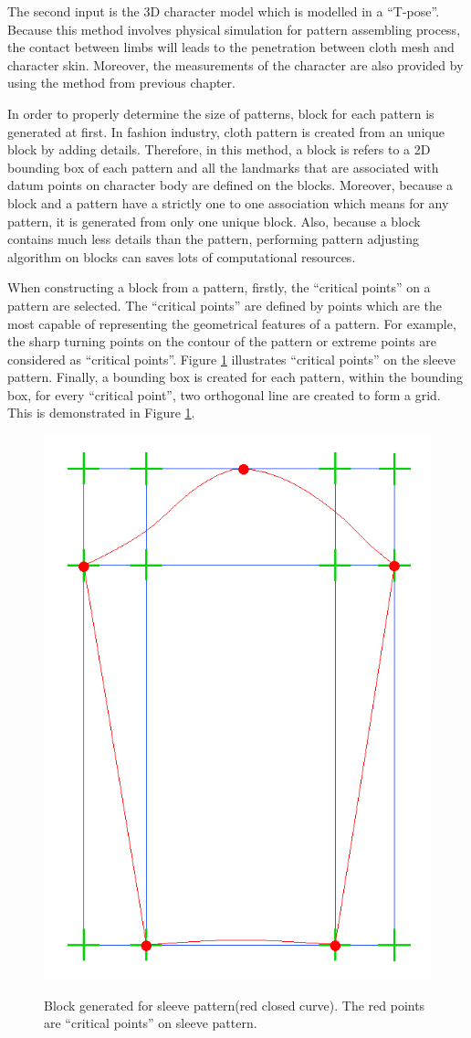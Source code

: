 The second input is the 3D character model which is modelled in a ``T-pose''. Because this method involves physical simulation for pattern assembling process, the contact between limbs will leads to the penetration between cloth mesh and character skin. Moreover, the measurements of the character are also provided by using the method from previous chapter.

In order to properly determine the size of patterns, block for each pattern is generated at first. In fashion industry, cloth pattern is created from an unique block by adding details. Therefore, in this method, a block is refers to a 2D bounding box of each pattern and all the landmarks that are associated with datum points on character body are defined on the blocks. Moreover, because a block and a pattern have a strictly one to one association which means for any pattern, it is generated from only one unique block. Also, because a block contains much less details than the pattern, performing pattern adjusting algorithm on blocks can saves lots of computational resources.

When constructing a block from a pattern, firstly, the ``critical points'' on a pattern are selected. The ``critical points'' are defined by points which are the most capable of representing the geometrical features of a pattern. For example, the sharp turning points on the contour of the pattern or extreme points are considered as ``critical points''. Figure \ref{figure:block_example} illustrates ``critical points'' on the sleeve pattern. Finally, a bounding box is created for each pattern, within the bounding box, for every ``critical point'', two orthogonal line are created to form a grid. This is demonstrated in Figure \ref{figure:block_example}. 

\begin{figure}[h]
	\centering
	\includegraphics[width=0.5\columnwidth]{../images/block}\\[0.1cm]
    \caption[Pattern and its block]{Block generated for sleeve pattern(red closed curve). The red points are ``critical points'' on sleeve pattern.}
    \label{figure:block_example}
\end{figure}

